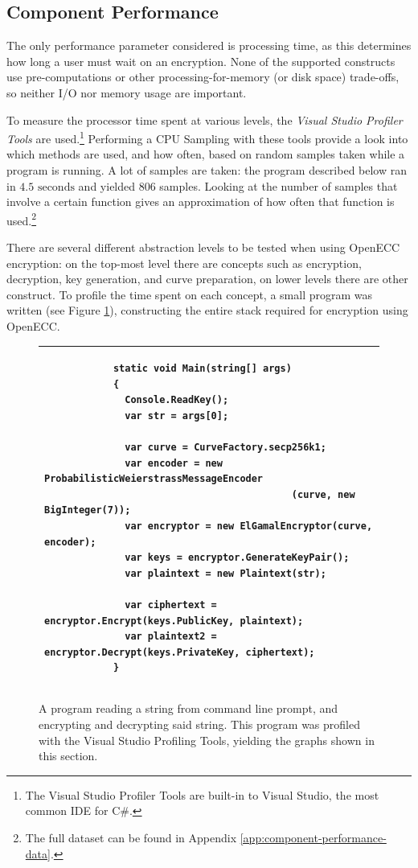 \subsection{Component Performance}
\label{sec:performance_components}

The only performance parameter considered is processing time, as this determines how long a user must wait on an encryption.
None of the supported constructs use pre-computations or other processing-for-memory (or disk space) trade-offs, so neither
I/O nor memory usage are important.

To measure the processor time spent at various levels, the \emph{Visual Studio Profiler Tools} are used.\footnote{The Visual
Studio Profiler Tools are built-in to Visual Studio, the most common IDE for C\#.} Performing a CPU Sampling with these tools
provide a look into which methods are used, and how often, based on random samples taken while a program is running. A lot of
samples are taken: the program described below ran in \(4.5 \text{ seconds}\) and yielded 806 samples. Looking at the number of samples
that involve a certain function gives an approximation of how often that function is used.\footnote{The full dataset can be
found in Appendix \ref{app:component-performance-data}.}

There are several different abstraction levels to be tested when using OpenECC encryption: on the top-most level there are concepts
such as encryption, decryption, key generation, and curve preparation, on lower levels there are other construct. To profile the time
spent on each concept, a small program was written (see Figure \ref{fig:profiler-code}), constructing the entire stack required for
encryption using OpenECC.

\begin{figure}[htb!]
	\centering
	\begin{tabular}{|p{\textwidth}|}
		\hline
		\begin{verbatim}
			static void Main(string[] args)
			{
			  Console.ReadKey();
			  var str = args[0];

			  var curve = CurveFactory.secp256k1;
			  var encoder = new ProbabilisticWeierstrassMessageEncoder
			                               (curve, new BigInteger(7));
			  var encryptor = new ElGamalEncryptor(curve, encoder);
			  var keys = encryptor.GenerateKeyPair();
			  var plaintext = new Plaintext(str);
			  
			  var ciphertext = encryptor.Encrypt(keys.PublicKey, plaintext);
			  var plaintext2 = encryptor.Decrypt(keys.PrivateKey, ciphertext);
			}
		\end{verbatim}
		\\
		\hline
	\end{tabular}
	\caption{A program reading a string from command line prompt, and encrypting and decrypting said string. This program
		was profiled with the Visual Studio Profiling Tools, yielding the graphs shown in this section.}
	\label{fig:profiler-code}
\end{figure}

